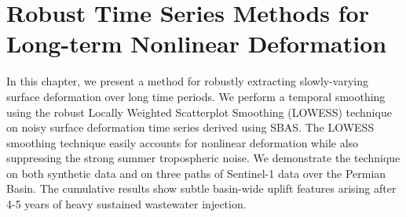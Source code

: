 %



\chapter{Robust Time Series Methods for Long-term Nonlinear Deformation}
\label{CHAP:5-robust-ts}


In this chapter, we present a method for robustly extracting slowly-varying surface deformation over long time periods.
We perform a temporal smoothing using the robust Locally Weighted Scatterplot Smoothing (LOWESS) technique \citep{Cleveland1979RobustLocallyWeighted} on noisy surface deformation time series derived using SBAS.
The LOWESS smoothing technique easily accounts for nonlinear deformation while also suppressing the strong summer tropospheric noise.
We demonstrate the technique on both synthetic data and on three paths of Sentinel-1 data over the Permian Basin.
The cumulative results show subtle basin-wide uplift features arising after 4-5 years of heavy sustained wastewater injection.



%	

